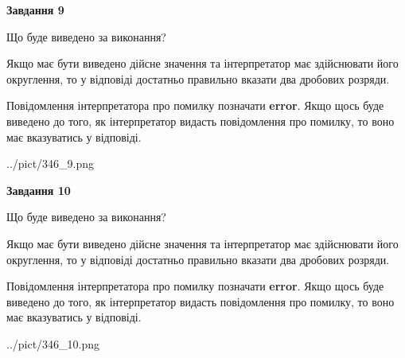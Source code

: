 \documentclass[12pt, ukrainian]{article}
\begin{document}
{\begin {Large}
{\begin {center}\textbf{Завдання 9}\end {center}}\par
Що буде виведено за виконання? \par

Якщо має бути виведено дійсне значення та інтерпретатор має здійснювати його округлення, 
то у відповіді достатньо правильно вказати два дробових розряди.

Повідомлення інтерпретатора про помилку позначати \textbf{error}.
Якщо щось буде виведено до того, як інтерпретатор видасть повідомлення про помилку, 
то воно має вказуватись у відповіді. \par

\begin{center}
	{../pict/346_9.png}
\end{center}
\newpage

{\begin {center}\textbf{Завдання 10}\end {center}}\par
Що буде виведено за виконання? \par

Якщо має бути виведено дійсне значення та інтерпретатор має здійснювати його округлення, 
то у відповіді достатньо правильно вказати два дробових розряди.

Повідомлення інтерпретатора про помилку позначати \textbf{error}.
Якщо щось буде виведено до того, як інтерпретатор видасть повідомлення про помилку, 
то воно має вказуватись у відповіді. \par

\begin{center}
	{../pict/346_10.png}
\end{center}
\newpage

\end {Large}}
\end{document}
